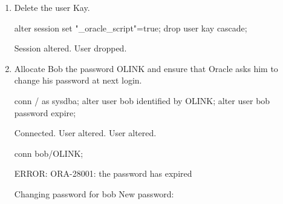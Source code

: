 \documentclass{article}
\begin{document}
\begin{enumerate}
\item{Delete the user Kay.}
\begin{sqlshell}
alter session set "_oracle_script"=true;
drop user kay cascade;
\end{sqlshell}
\begin{messageshell}
Session altered.
User dropped.
\end{messageshell}
\item{Allocate Bob the password OLINK and ensure that Oracle asks him to change his password at next login.}
\begin{sqlshell}
conn / as sysdba;
alter user bob identified by OLINK;
alter user bob password expire;
\end{sqlshell}
\begin{messageshell}
Connected.
User altered.
User altered.
\end{messageshell}
\begin{sqlshell}
conn bob/OLINK;
\end{sqlshell}
\begin{messageshell}
ERROR:
ORA-28001: the password has expired


Changing password for bob
New password:
\end{messageshell}
\end{enumerate}
\end{document}
